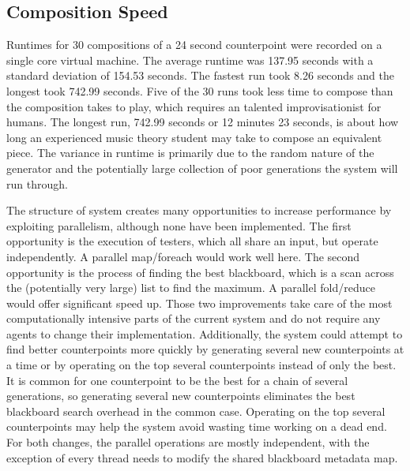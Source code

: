 \subsection{Composition Speed} 
Runtimes for 30 compositions of a 24 second counterpoint were recorded on a single core virtual machine.
The average runtime was 137.95 seconds with a standard deviation of 154.53 seconds.
The fastest run took 8.26 seconds and the longest took 742.99 seconds.
Five of the 30 runs took less time to compose than the composition takes to play, which requires an talented improvisationist for humans.
The longest run, 742.99 seconds or 12 minutes 23 seconds, is about how long an experienced music theory student may take to compose an equivalent piece.
The variance in runtime is primarily due to the random nature of the generator and the potentially large collection of poor generations the system will run through.

The structure of system creates many opportunities to increase performance by exploiting parallelism, although none have been implemented.
The first opportunity is the execution of testers, which all share an input, but operate independently. A parallel map/foreach would work well here.
The second opportunity is the process of finding the best blackboard, which is a scan across the (potentially very large) list to find the maximum. A parallel fold/reduce would offer significant speed up.
Those two improvements take care of the most computationally intensive parts of the current system and do not require any agents to change their implementation.
Additionally, the system could attempt to find better counterpoints more quickly by generating several new counterpoints at a time or by operating on the top several counterpoints instead of only the best.
It is common for one counterpoint to be the best for a chain of several generations, so generating several new counterpoints eliminates the best blackboard search overhead in the common case.
Operating on the top several counterpoints may help the system avoid wasting time working on a dead end.
For both changes, the parallel operations are mostly independent, with the exception of every thread needs to modify the shared blackboard metadata map.
